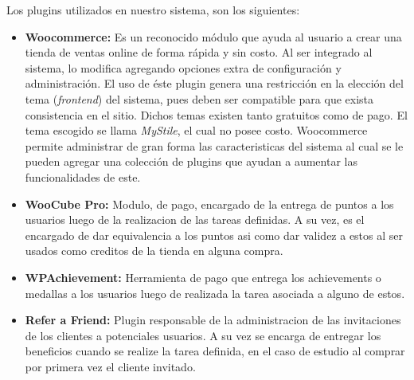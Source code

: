 Los plugins utilizados en nuestro sistema, son los siguientes:

\begin{itemize}

\item {\bf Woocommerce:}
        Es un reconocido módulo que ayuda al usuario a crear una tienda de
        ventas online de forma rápida y sin costo.
        Al ser integrado al sistema, lo modifica agregando opciones
        extra de configuración y administración.
        El uso de éste plugin genera una restricción en la elección
        del tema (\emph{frontend}) del sistema, pues deben ser compatible
        para que exista consistencia en el sitio.
        Dichos temas existen tanto gratuitos como de pago.
        El tema escogido se llama \emph{MyStile}, el cual no posee costo.
        Woocommerce permite administrar de gran forma las caracteristicas del
        sistema al cual se le pueden agregar una colección de plugins que ayudan a 
	aumentar las funcionalidades de este.

    \item {\bf WooCube Pro:}
	Modulo, de pago, encargado de la entrega de puntos a los usuarios luego de la
realizacion de las tareas definidas. A su vez, es el encargado de dar equivalencia a los puntos asi como
dar validez a estos al ser usados como creditos de la tienda en alguna compra.
    \item {\bf WPAchievement:}
        Herramienta de pago que entrega los achievements o medallas a los usuarios
luego de realizada la tarea asociada a alguno de estos.

    \item {\bf Refer a Friend:}
        Plugin responsable de la administracion de las invitaciones de los clientes a
potenciales usuarios. A su vez se encarga de entregar los beneficios cuando se realize la tarea
definida, en el caso de estudio al comprar por primera vez el cliente invitado.

\end{itemize}
